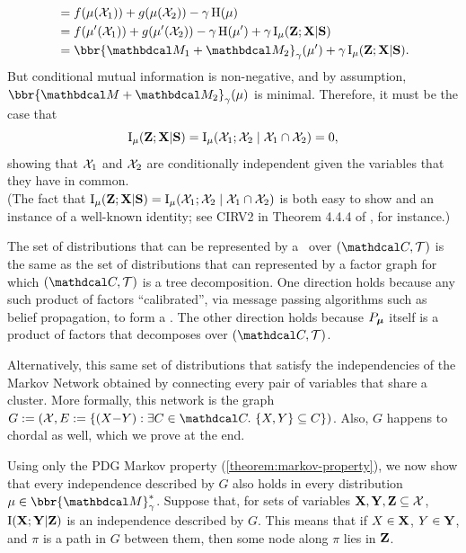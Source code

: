 \begin{subappendices}
\begin{lproof}
\begin{align*}
         &= f(\mu(\X_1)) + g(\mu(\X_2)) - \gamma \H(\mu) \\
         &= f(\mu'(\X_1)) + g(\mu'(\X_2)) - \gamma \H(\mu') + \gamma \I_\mu(\mat Z; \mat X| \mat S) \\
         &= \bbr{\dg M_1 \bundle \dg M_2}_\gamma(\mu') + \gamma \I_\mu(\mat Z; \mat X| \mat S).
    \end{align*}
    But conditional mutual information is non-negative, and by assumption, $\bbr{\dg M \bundle \dg M_2}_\gamma(\mu)$ is minimal. Therefore, it must be the case that
    \[
        \operatorname{\mathrm{I}}_\mu(\mathbf Z; \mathbf X| \mathbf S) = \operatorname{\mathrm{I}}_\mu(\mathcal X_1; \mathcal X_2 \mid \mathcal X_1 \cap \mathcal X_2) = 0,
    \]
    showing that $\mathcal X_1$ and $\mathcal X_2$ are conditionally independent given the variables that they have in common. \\
    (The fact that $\operatorname{\mathrm{I}}_\mu(\mathbf Z; \mathbf X| \mathbf S) = \operatorname{\mathrm{I}}_\mu(\mathcal X_1; \mathcal X_2 \mid \mathcal X_1 \cap \mathcal X_2)$ is both easy to show and an instance of a well-known identity; see CIRV2 in Theorem 4.4.4 of \textcite{halpern-RAU}, for instance.)
\end{lproof}

\begin{lproof}\label{proof:can-use-cliquetree}

    The set of distributions that can be represented by a \cactree\ over $(\C,\cal T)$ is the same as the set of distributions that can represented by a factor graph for which $(\C, \cal T)$ is a tree decomposition.
    One direction holds because any such product of factors ``calibrated'', via message passing algorithms such as belief propagation, to form a \actree.
    The other direction holds because $P_{\boldsymbol\mu}$ itself is a product of factors that decomposes over $(\C, \cal T)$.



    Alternatively, this same set of distributions that satisfy the independencies of the Markov Network obtained by connecting every pair of variables that share a cluster.
    More formally, this network is the graph $G := (\X, E := \{ (X{-}Y) :  \exists C \in \C.~\{X,Y\} \subseteq C\})$.
    Also, $G$ happens to chordal as well, which we prove at the end.


    Using only the PDG Markov property (\cref{theorem:markov-property}), we now show that every independence described by $G$ also holds in every distribution $\mu \in \bbr{\dg M}^*_\gamma$.
    Suppose that,
    for sets of variables $\mathbf X, \mathbf Y, \mathbf Z \subseteq \mathcal X$,
    $\operatorname{\mathrm{I}}(\mathbf X; \mathbf Y|\mathbf Z)$ is an independence
    described by $G$.
    This means \parencite[Defn 4.8]{KF09} that
    if $X \in \mathbf X$, $Y \in \mathbf Y$, and $\pi$ is a path in $G$ between them, then
    some node along $\pi$ lies in $\mathbf Z$.



\end{lproof}
\end{subappendices}
